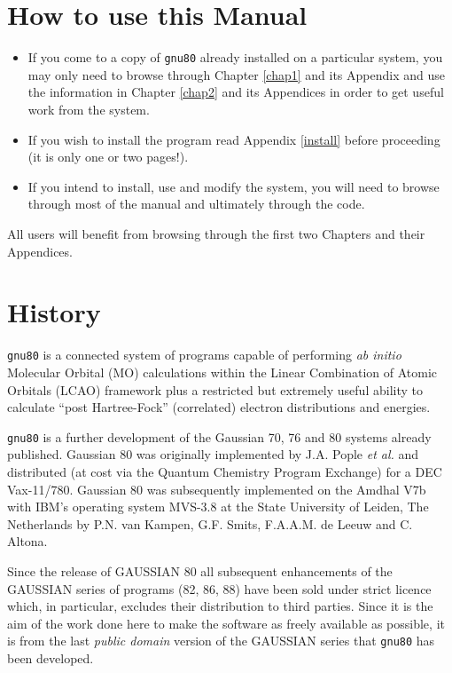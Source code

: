 \chapter*{\sf How to use this Manual}
\thispagestyle{plain}
\begin{itemize}
\item If you come to a copy of {\tt gnu80} already installed on a
particular system, you may only need to browse through
Chapter \ref{chap1} and its Appendix and use the information
in Chapter \ref{chap2} and its Appendices in order to get useful
work from the system.
\item If you wish to install the program read  Appendix \ref{install} before
proceeding (it is only one or two pages!).
\item If you intend to install, use and modify the system, you
will need to browse through most of the manual and ultimately through
the code.
\end{itemize}
All users will benefit from browsing through the first two Chapters and
their Appendices.
\chapter*{\sf History}
\thispagestyle{plain}
{\tt gnu80} is a connected system of programs capable of
performing {\em ab initio} Molecular Orbital (MO) calculations within the
Linear Combination of Atomic Orbitals (LCAO) framework 
plus a restricted but extremely useful
ability to calculate ``post Hartree-Fock'' (correlated) electron
distributions and energies. 

{\tt gnu80} is a
further development of the Gaussian 70, 76 and 80 systems already
published. Gaussian 80 was originally implemented by J.A. Pople {\em et al.}
and distributed (at cost via the Quantum Chemistry Program Exchange)
for a DEC
Vax-11/780.  Gaussian 80 was subsequently implemented 
on the Amdhal V7b with
IBM's operating system MVS-3.8 at the State University of Leiden, The
Netherlands by P.N. van Kampen, G.F. Smits, F.A.A.M. de Leeuw and C.
Altona. 

Since the release of GAUSSIAN 80 all subsequent enhancements of
the GAUSSIAN series of programs (82, 86, 88) have been sold under
strict licence which, in particular, excludes their distribution
to third parties. Since it is the aim of the work done here to make
the software as freely available as possible,
it is from the last 
{\em 
public domain} 
version of the GAUSSIAN
series that {\tt gnu80} has been developed.

